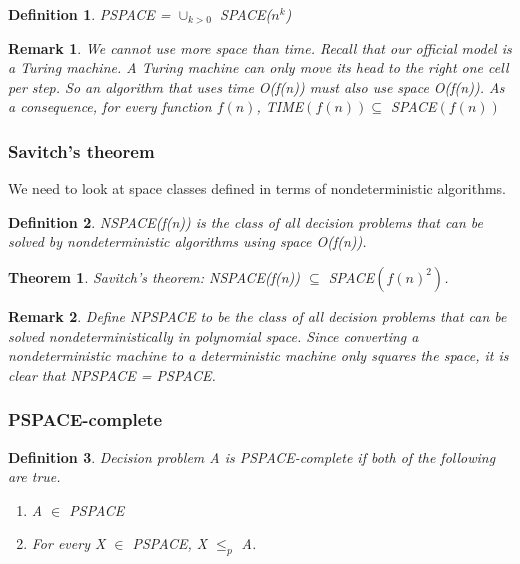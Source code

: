 \documentclass[12pt]{article}
\newtheorem{definition}{Definition}
\newtheorem{theorem}{Theorem}
\newtheorem*{remark}{Remark}
\begin{document}
\begin{definition}
    PSPACE = $\cup _{k>0}$ SPACE($n^k$)
\end{definition}

\begin{remark}
    We cannot use more space than time.  Recall that our official model is a Turing machine. A Turing machine can only move its head to the right one cell per step.  So an algorithm that uses time O(f(n)) must also use space O(f(n)). As a consequence, for every function $f(n)$, TIME$(f(n)) \subseteq$ SPACE$(f(n))$
\end{remark}

\subsubsection{Savitch's theorem}

We need to look at space classes defined in terms of nondeterministic algorithms.

\begin{definition}
    NSPACE(f(n)) is the class of all decision problems that can be solved by nondeterministic algorithms using space O(f(n)).
\end{definition}

\begin{theorem}
    Savitch's theorem: NSPACE(f(n)) $\subseteq$ SPACE$(f(n)^2)$.
\end{theorem}

\begin{remark}
    Define NPSPACE to be the class of all decision problems that can be solved nondeterministically in polynomial space.  Since converting a nondeterministic machine to a deterministic machine only squares the space, it is clear that NPSPACE = PSPACE.
\end{remark}

\subsubsection{PSPACE-complete}

\begin{definition}
    Decision problem A is PSPACE-complete if both of the following are true.
    \begin{enumerate}
        \item A $\in$ PSPACE
        \item For every X $\in$ PSPACE, X $\leq_p$ A.
    \end{enumerate}
\end{definition}
\end{document}
